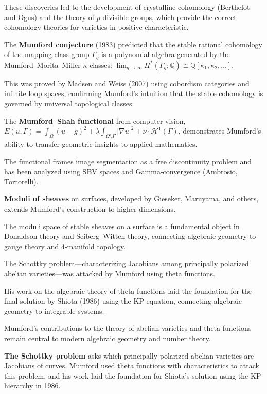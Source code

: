 These discoveries led to the development of crystalline cohomology (Berthelot and Ogus) and the theory of $p$-divisible groups, which provide the correct cohomology theories for varieties in positive characteristic.

The \textbf{Mumford conjecture} (1983) predicted that the stable rational cohomology of the mapping class group $\Gamma_g$ is a polynomial algebra generated by the Mumford--Morita--Miller $\kappa$-classes: $\lim_{g \to \infty} H^*(\Gamma_g; \mathbb{Q}) \cong \mathbb{Q}[\kappa_1, \kappa_2, \ldots]$.

This was proved by Madsen and Weiss (2007) using cobordism categories and infinite loop spaces, confirming Mumford's intuition that the stable cohomology is governed by universal topological classes.

The \textbf{Mumford--Shah functional} from computer vision, $E(u, \Gamma) = \int_\Omega (u-g)^2 + \lambda \int_{\Omega \setminus \Gamma} |\nabla u|^2 + \nu \cdot \mathcal{H}^1(\Gamma)$, demonstrates Mumford's ability to transfer geometric insights to applied mathematics.

The functional frames image segmentation as a free discontinuity problem and has been analyzed using SBV spaces and Gamma-convergence (Ambrosio, Tortorelli).

\textbf{Moduli of sheaves} on surfaces, developed by Gieseker, Maruyama, and others, extends Mumford's construction to higher dimensions.

The moduli space of stable sheaves on a surface is a fundamental object in Donaldson theory and Seiberg--Witten theory, connecting algebraic geometry to gauge theory and 4-manifold topology.

The Schottky problem---characterizing Jacobians among principally polarized abelian varieties---was attacked by Mumford using theta functions.

His work on the algebraic theory of theta functions laid the foundation for the final solution by Shiota (1986) using the KP equation, connecting algebraic geometry to integrable systems.

Mumford's contributions to the theory of abelian varieties and theta functions remain central to modern algebraic geometry and number theory.

\textbf{The Schottky problem} asks which principally polarized abelian varieties are Jacobians of curves. Mumford used theta functions with characteristics to attack this problem, and his work laid the foundation for Shiota's solution using the KP hierarchy in 1986.

